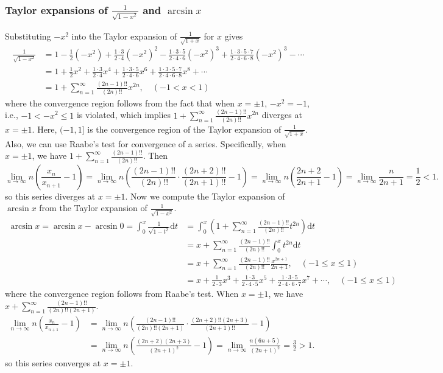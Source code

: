 \documentclass{article}
\theoremstyle{remark}
\begin{document}
\subsubsection{Taylor expansions of $\frac{1}{\sqrt{1-x^2}}$ and $\arcsin x$}
Substituting $-x^2$ into the Taylor expansion of $\frac{1}{\sqrt{1+x}}$ for $x$ gives
\begin{align*}
  \frac{1}{\sqrt{1-x^2}} &=1-\frac{1}{2}(-x^2)+\frac{1\cdot 3}{2\cdot 4}(-x^2)^2-\frac{1\cdot 3\cdot 5}{2\cdot 4\cdot 6}(-x^2)^3+\frac{1\cdot 3\cdot 5\cdot 7}{2\cdot 4\cdot 6\cdot 8}(-x^2)^3-\cdots\\
  &=1+\frac{1}{2}x^2+\frac{1\cdot 3}{2\cdot 4}x^4+\frac{1\cdot 3\cdot 5}{2\cdot 4\cdot 6}x^6+\frac{1\cdot 3\cdot 5\cdot 7}{2\cdot 4\cdot 6\cdot 8}x^8+\cdots\\
&=1+\sum_{n=1}^{\infty}\frac{(2n-1)!!}{(2n)!!}x^{2n},\quad (-1< x< 1)
\end{align*}
where the convergence region follows from the fact that when $x=\pm1$, $-x^2=-1$, i.e., $-1<-x^2\le1$ is violated, which implies $1+\sum_{n=1}^{\infty}\frac{(2n-1)!!}{(2n)!!}x^{2n}$ diverges at $x=\pm1$. Here, $(-1,1]$ is the convergence region of the Taylor expansion of $\frac{1}{\sqrt{1+x}}$. Also, we can use Raabe's test for convergence of a series. Specifically, when $x=\pm1$, we have $1+\sum_{n=1}^{\infty}\frac{(2n-1)!!}{(2n)!!}$. Then
\[
\lim_{n\to\infty} n\left(\frac{x_n}{x_{n+1}}-1 \right)=\lim_{n\to\infty} n\left(\frac{(2n-1)!!}{(2n)!!}\cdot\frac{(2n+2)!!}{(2n+1)!!}-1\right)
=\lim_{n\to\infty} n\left(\frac{2n+2}{2n+1}-1\right)=\lim_{n\to\infty}\frac{n}{2n+1}=\frac{1}{2}<1.
\]
so this series diverges at $x=\pm1$. Now we compute the Taylor expansion of $\arcsin x$ from the Taylor expansion of $\frac{1}{\sqrt{1-x^2}}$. 
\begin{align*}
  \arcsin x=\arcsin x-\arcsin 0=\int_{0}^{x}\frac{1}{\sqrt{1-t^2}}\mathrm{d}t &=\int_{0}^{x} (1+\sum_{n=1}^{\infty}\frac{(2n-1)!!}{(2n)!!}t^{2n})\mathrm{d}t \\
  &=x+\sum_{n=1}^{\infty}\frac{(2n-1)!!}{(2n)!!}\int_{0}^{x}t^{2n}\mathrm{d}t \\
  &=x+\sum_{n=1}^{\infty}\frac{(2n-1)!!}{(2n)!!}\frac{x^{2n+1}}{2n+1},\quad (-1\le x\le 1)\\
  &=x+\frac{1}{2\cdot 3}x^3+\frac{1\cdot 3}{2\cdot 4\cdot5}x^5+\frac{1\cdot 3\cdot 5}{2\cdot 4\cdot 6\cdot7}x^7+\cdots,\quad (-1\le x\le 1)
\end{align*}
where the convergence region follows from Raabe's test. When $x=\pm1$, we have $x+\sum_{n=1}^{\infty}\frac{(2n-1)!!}{(2n)!!(2n+1)}$.
\begin{align*}
\lim_{n\to\infty} n\left(\frac{x_n}{x_{n+1}}-1 \right)&=\lim_{n\to\infty} n\left(\frac{(2n-1)!!}{(2n)!!(2n+1)}\cdot\frac{(2n+2)!!(2n+3)}{(2n+1)!!}-1\right)\\
&=\lim_{n\to\infty} n\left(\frac{(2n+2)(2n+3)}{(2n+1)^2}-1\right)=\lim_{n\to\infty}\frac{n(6n+5)}{(2n+1)^2}=\frac{3}{2}>1.
\end{align*}
so this series converges at $x=\pm1$.
\end{document}
